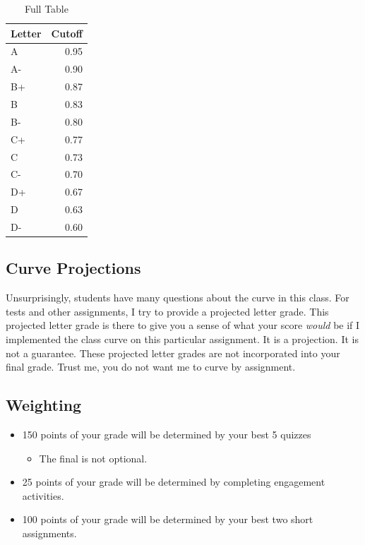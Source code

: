 \begin{table}

\caption{\label{tab:unnamed-chunk-4}Full Table}
\centering
\begin{tabular}[t]{l|r}
\hline
Letter & Cutoff\\
\hline
A & 0.95\\
\hline
A- & 0.90\\
\hline
B+ & 0.87\\
\hline
B & 0.83\\
\hline
B- & 0.80\\
\hline
C+ & 0.77\\
\hline
C & 0.73\\
\hline
C- & 0.70\\
\hline
D+ & 0.67\\
\hline
D & 0.63\\
\hline
D- & 0.60\\
\hline
\end{tabular}
\end{table}

\hypertarget{curve-projections}{%
\subsection*{Curve Projections}\label{curve-projections}}


Unsurprisingly, students have many questions about the curve in this class. For tests and other assignments, I try to provide a projected letter grade.
This projected letter grade is there to give you a sense of what your score \emph{would} be if I implemented the class curve on this particular assignment.
It is a projection. It is not a guarantee. These projected letter grades are not incorporated into your final grade.
Trust me, you do not want me to curve by assignment.

\hypertarget{weighting}{%
\subsection*{Weighting}\label{weighting}}


\begin{itemize}
\tightlist
\item
  150 points of your grade will be determined by your best 5 quizzes

  \begin{itemize}
  \tightlist
  \item
    The final is not optional.
  \end{itemize}
\item
  25 points of your grade will be determined by completing engagement activities.
\item
  100 points of your grade will be determined by your best two short assignments.
\end{itemize}

